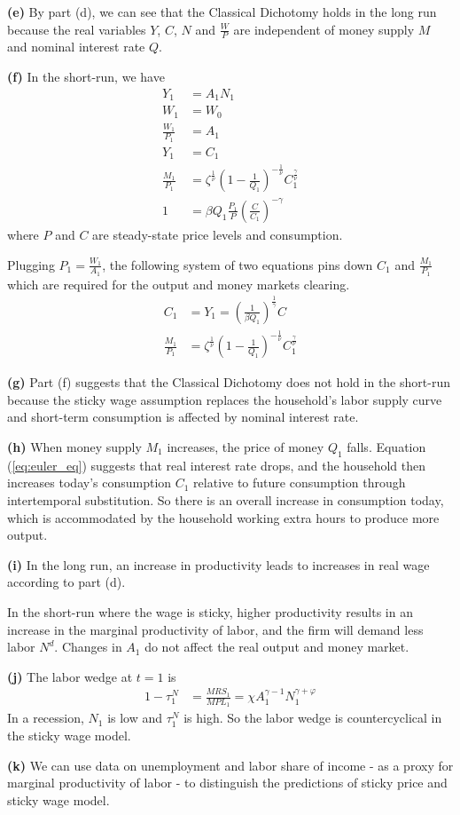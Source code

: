 \documentclass[12pt]{article}
\begin{document}
\textbf{(e)} By part (d), we can see that the Classical Dichotomy holds in the long run because the real variables $Y$, $C$, $N$ and $\frac{W}{P}$ are independent of money supply $M$ and nominal interest rate $Q$.

\textbf{(f)} In the short-run, we have 
\begin{align*}
Y_{1} &= A_{1}N_{1} \\
W_{1} &= W_{0} \\
\frac{W_{1}}{P_{1}} &= A_{1} \\
Y_{1} &= C_{1} \\
\frac{M_{1}}{P_{1}} &= \zeta^{\frac{1}{\nu}}\left(1-\frac{1}{Q_{1}}\right)^{-\frac{1}{\nu}}C^{\frac{\gamma}{\nu}}_{1} \\
1 &= \beta Q_{1} \frac{P_{1}}{P} \left(\frac{C}{C_{1}}\right)^{-\gamma}
\end{align*}
where $P$ and $C$ are steady-state price levels and consumption.

Plugging $P_{1}=\frac{W_{1}}{A_{1}}$, the following system of two equations pins down $C_{1}$ and $\frac{M_{1}}{P_{1}}$ which are required for the output and money markets clearing.
\begin{align}
\label{eq:euler_eq}
C_{1} &= Y_{1} = \left(\frac{1}{\beta Q_{1}}\right)^{\frac{1}{\gamma}}C \\
\label{eq:money_demand}
\frac{M_{1}}{P_{1}} &= \zeta^{\frac{1}{\nu}}\left(1-\frac{1}{Q_{1}}\right)^{-\frac{1}{\nu}}C^{\frac{\gamma}{\nu}}_{1} 
\end{align}

\textbf{(g)} Part (f) suggests that the Classical Dichotomy does not hold in the short-run because the sticky wage assumption replaces the household's labor supply curve and short-term consumption is affected by nominal interest rate.

\textbf{(h)} When money supply $M_{1}$ increases, the price of money $Q_{1}$ falls. 
Equation (\ref{eq:euler_eq}) suggests that real interest rate drops, 
and the household then increases today's consumption $C_{1}$ relative to future consumption through intertemporal substitution. 
So there is an overall increase in consumption today, 
which is accommodated by the household working extra hours to produce more output.

\textbf{(i)} In the long run, an increase in productivity leads to increases in 
real wage according to part (d).

In the short-run where the wage is sticky, higher productivity results in an increase in the marginal productivity of labor, and the firm will demand less labor $N^{d}$. 
Changes in $A_{1}$ do not affect the real output and money market.  

\textbf{(j)} The labor wedge at $t=1$ is
\begin{align*}
1-\tau^{N}_{1} &= \frac{MRS_{1}}{MPL_{1}} = \chi A^{\gamma-1}_{1}N^{\gamma+\varphi}_{1}
\end{align*}
In a recession, $N_{1}$ is low and $\tau^{N}_{1}$ is high.
So the labor wedge is countercyclical in the sticky wage model.

\textbf{(k)} We can use data on unemployment and labor share of income - as a proxy for marginal productivity of labor - to distinguish the predictions of sticky price and sticky wage model.
\end{document}
